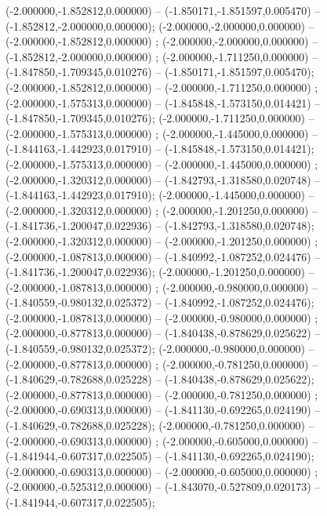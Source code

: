  (-2.000000,-1.852812,0.000000) -- (-1.850171,-1.851597,0.005470) -- (-1.852812,-2.000000,0.000000);
 (-2.000000,-2.000000,0.000000) -- (-2.000000,-1.852812,0.000000) ;
 (-2.000000,-2.000000,0.000000) -- (-1.852812,-2.000000,0.000000) ;
 (-2.000000,-1.711250,0.000000) -- (-1.847850,-1.709345,0.010276) -- (-1.850171,-1.851597,0.005470);
 (-2.000000,-1.852812,0.000000) -- (-2.000000,-1.711250,0.000000) ;
 (-2.000000,-1.575313,0.000000) -- (-1.845848,-1.573150,0.014421) -- (-1.847850,-1.709345,0.010276);
 (-2.000000,-1.711250,0.000000) -- (-2.000000,-1.575313,0.000000) ;
 (-2.000000,-1.445000,0.000000) -- (-1.844163,-1.442923,0.017910) -- (-1.845848,-1.573150,0.014421);
 (-2.000000,-1.575313,0.000000) -- (-2.000000,-1.445000,0.000000) ;
 (-2.000000,-1.320312,0.000000) -- (-1.842793,-1.318580,0.020748) -- (-1.844163,-1.442923,0.017910);
 (-2.000000,-1.445000,0.000000) -- (-2.000000,-1.320312,0.000000) ;
 (-2.000000,-1.201250,0.000000) -- (-1.841736,-1.200047,0.022936) -- (-1.842793,-1.318580,0.020748);
 (-2.000000,-1.320312,0.000000) -- (-2.000000,-1.201250,0.000000) ;
 (-2.000000,-1.087813,0.000000) -- (-1.840992,-1.087252,0.024476) -- (-1.841736,-1.200047,0.022936);
 (-2.000000,-1.201250,0.000000) -- (-2.000000,-1.087813,0.000000) ;
 (-2.000000,-0.980000,0.000000) -- (-1.840559,-0.980132,0.025372) -- (-1.840992,-1.087252,0.024476);
 (-2.000000,-1.087813,0.000000) -- (-2.000000,-0.980000,0.000000) ;
 (-2.000000,-0.877813,0.000000) -- (-1.840438,-0.878629,0.025622) -- (-1.840559,-0.980132,0.025372);
 (-2.000000,-0.980000,0.000000) -- (-2.000000,-0.877813,0.000000) ;
 (-2.000000,-0.781250,0.000000) -- (-1.840629,-0.782688,0.025228) -- (-1.840438,-0.878629,0.025622);
 (-2.000000,-0.877813,0.000000) -- (-2.000000,-0.781250,0.000000) ;
 (-2.000000,-0.690313,0.000000) -- (-1.841130,-0.692265,0.024190) -- (-1.840629,-0.782688,0.025228);
 (-2.000000,-0.781250,0.000000) -- (-2.000000,-0.690313,0.000000) ;
 (-2.000000,-0.605000,0.000000) -- (-1.841944,-0.607317,0.022505) -- (-1.841130,-0.692265,0.024190);
 (-2.000000,-0.690313,0.000000) -- (-2.000000,-0.605000,0.000000) ;
 (-2.000000,-0.525312,0.000000) -- (-1.843070,-0.527809,0.020173) -- (-1.841944,-0.607317,0.022505);
